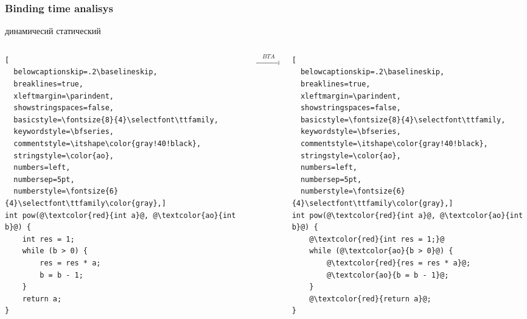 \documentclass[demo]{beamer}
\begin{document}
\lstset{language=C}
\begin{frame}[fragile]\frametitle{Binding time analisys}
\color{red} динамичесий \color{ao} статический
\color{black}
\begin{columns}
\begin{column}{0.4\textwidth}
\begin{lstlisting}[
  belowcaptionskip=.2\baselineskip,
  breaklines=true,
  xleftmargin=\parindent,
  showstringspaces=false,
  basicstyle=\fontsize{8}{4}\selectfont\ttfamily,
  keywordstyle=\bfseries,
  commentstyle=\itshape\color{gray!40!black},
  stringstyle=\color{ao},
  numbers=left,
  numbersep=5pt,
  numberstyle=\fontsize{6}{4}\selectfont\ttfamily\color{gray},]
int pow(@\textcolor{red}{int a}@, @\textcolor{ao}{int b}@) {
    int res = 1;
    while (b > 0) {
        res = res * a;
        b = b - 1;
    }
    return a;
}
\end{lstlisting}
\end{column}
\begin{column}{0.2\textwidth}
$$\xrightarrow{\quad BTA \quad}$$
\end{column}
\begin{column}{0.4\textwidth}
\begin{lstlisting}[
  belowcaptionskip=.2\baselineskip,
  breaklines=true,
  xleftmargin=\parindent,
  showstringspaces=false,
  basicstyle=\fontsize{8}{4}\selectfont\ttfamily,
  keywordstyle=\bfseries,
  commentstyle=\itshape\color{gray!40!black},
  stringstyle=\color{ao},
  numbers=left,
  numbersep=5pt,
  numberstyle=\fontsize{6}{4}\selectfont\ttfamily\color{gray},]
int pow(@\textcolor{red}{int a}@, @\textcolor{ao}{int b}@) {
    @\textcolor{red}{int res = 1;}@
    while (@\textcolor{ao}{b > 0}@) {
        @\textcolor{red}{res = res * a}@;
        @\textcolor{ao}{b = b - 1}@;
    }
    @\textcolor{red}{return a}@;
}
\end{lstlisting}
\end{column}
\end{columns}
\end{frame}
\end{document}
